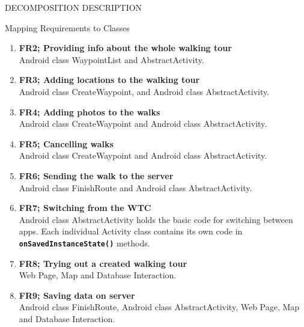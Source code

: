 \documentclass{article}
\begin{document}
\begin{section}{DECOMPOSITION DESCRIPTION}
\begin{subsection}{Mapping Requirements to Classes}
\begin{enumerate}
		    \item{{\bf FR2; Providing info about the whole walking tour} \\
			Android class WaypointList and AbstractActivity.}

		    \item{{\bf FR3; Adding locations to the walking tour} \\
		    Android class CreateWaypoint, and Android class AbstractActivity.}

		    \item{{\bf FR4; Adding photos to the walks} \\
		    Android class CreateWaypoint and Android class AbstractActivity.}

		    \item{{\bf FR5; Cancelling walks} \\
		    Android class CreateWaypoint and Android class AbstractActivity.}

		    \item{{\bf FR6; Sending the walk to the server} \\
		    Android class FinishRoute and Android class AbstractActivity.}

		    \item{{\bf FR7; Switching from the WTC} \\
		    Android class AbstractActivity holds the basic code for switching between apps. Each individual Activity class contains its own code in {\tt \bf onSavedInstanceState()} methods.}

		    \item{{\bf FR8; Trying out a created walking tour} \\
		    Web Page, Map and Database Interaction.}

		    \item{{\bf FR9; Saving data on server} \\
		    Android class FinishRoute, Android class AbstractActivity, Web Page, Map and Database Interaction.}
        \end{enumerate}
	\end{subsection}
\end{section}
\end{document}
